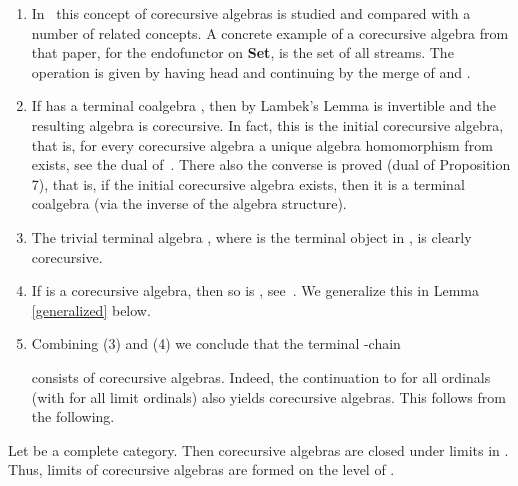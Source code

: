 \documentclass{LMCS}
\newcommand{\takeout}[1]{\empty}
\theoremstyle{plain}
\theoremstyle{definition}
\numberwithin{equation}{section}
\begin{document}
\begin{exa}\label{exam of core}\hfill
  \begin{enumerate}
  \item  In~\cite{cuv2} this concept of corecursive algebras is studied and compared with a number of related concepts. A concrete example of a corecursive algebra from that paper, for the endofunctor  on {\bf Set}, is the set  of all streams. The operation  is given by  having head  and continuing by the merge of  and .

\takeout{
(2) In a category with finite products consider algebras on one binary operation, i.e., . An algebra  is corecursive iff it has a unique idempotent (global) element. That is, a unique  with .

Indeed, this is necessary since  is the solution of . And it is sufficient: given an equation morphism , the morphism  is
easily seen to be the unique solution of  in .
}

\item If  has a terminal coalgebra , then by Lambek's Lemma  is invertible and the resulting algebra  is corecursive. In fact, this is the initial corecursive algebra, that is, for every corecursive algebra   a unique algebra homomorphism  from  exists, see the dual of~\cite[Proposition~2]{cuv2}. There also the converse is proved (dual of Proposition 7), that is, if the initial corecursive algebra exists, then it is a terminal coalgebra (via the inverse of the algebra structure).

\item The trivial terminal algebra , where  is the terminal object in , is clearly corecursive.

\item If  is a corecursive algebra, then so is , see~\cite[Proposition~6]{cuv2}. We generalize this in Lemma \ref{generalized} below.

\item Combining (3) and (4) we conclude that the terminal -chain

consists of corecursive algebras. Indeed, the continuation to 
for all ordinals (with  for all limit
ordinals) also yields corecursive algebras. This follows from the
following.
\end{enumerate}
\end{exa}

\begin{prop}\label{lim of core is core}
Let  be a complete category. Then corecursive algebras are closed under limits in . Thus, limits of corecursive algebras are formed on the level of .
\end{prop}
\end{document}
